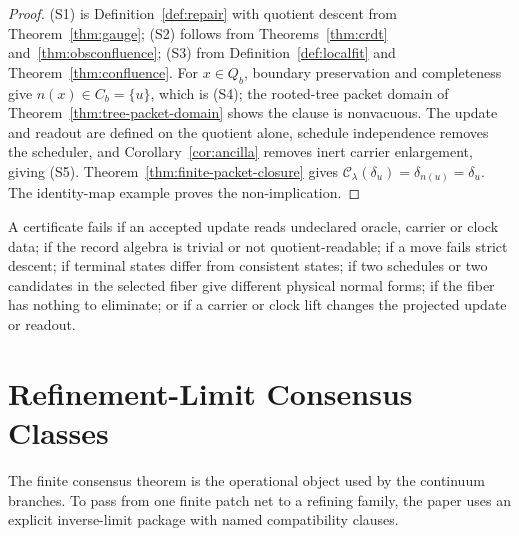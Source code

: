 \documentclass[11pt]{article}
\theoremstyle{remark}
\theoremstyle{plain}
\begin{document}
\begin{proof}
(S1) is Definition~\ref{def:repair} with quotient descent from
Theorem~\ref{thm:gauge}; (S2) follows from Theorems~\ref{thm:crdt}
and~\ref{thm:obsconfluence}; (S3) from Definition~\ref{def:localfit} and
Theorem~\ref{thm:confluence}. For \(x\in Q_b\), boundary preservation and
completeness give \(n(x)\in C_b=\{u\}\), which is (S4); the rooted-tree
packet domain of Theorem~\ref{thm:tree-packet-domain} shows the clause is
nonvacuous. The update and readout are defined on the quotient alone,
schedule independence removes the scheduler, and
Corollary~\ref{cor:ancilla} removes inert carrier enlargement, giving (S5).
Theorem~\ref{thm:finite-packet-closure} gives
\(\mathcal C_\lambda(\delta_u)=\delta_{n(u)}=\delta_u\). The identity-map
example proves the non-implication.
\end{proof}

A certificate fails if an accepted update reads undeclared oracle, carrier
or clock data; if the record algebra is trivial or not quotient-readable;
if a move fails strict descent; if terminal states differ from consistent
states; if two schedules or two candidates in the selected fiber give
different physical normal forms; if the fiber has nothing to eliminate; or
if a carrier or clock lift changes the projected update or readout.


\section{Refinement-Limit Consensus Classes}
\label{sec:refinement-consensus}

The finite consensus theorem is the operational object used by the continuum branches. To pass
from one finite patch net to a refining family, the paper uses an explicit inverse-limit package
with named compatibility clauses.
\end{document}
